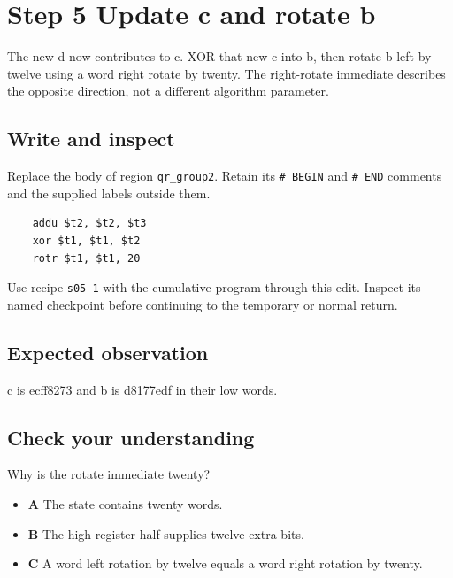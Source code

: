 \section{Step 5 Update c and rotate b}\label{chacha-s05}

The new d now contributes to c. XOR that new c into b, then rotate b left by twelve using a word right rotate by twenty. The right-rotate immediate describes the opposite direction, not a different algorithm parameter.

\subsection{Write and inspect}
Replace the body of region \texttt{qr\_group2}. Retain its \texttt{\# BEGIN} and \texttt{\# END} comments and the supplied labels outside them.

\begin{verbatim}
    addu $t2, $t2, $t3
    xor $t1, $t1, $t2
    rotr $t1, $t1, 20
\end{verbatim}

Use recipe \texttt{s05-1} with the cumulative program through this edit. Inspect its named checkpoint before continuing to the temporary or normal return.

\subsection{Expected observation}
c is ecff8273 and b is d8177edf in their low words.

\subsection{Check your understanding}
Why is the rotate immediate twenty?

\begin{itemize}
  \item \textbf{A} The state contains twenty words.
  \item \textbf{B} The high register half supplies twelve extra bits.
  \item \textbf{C} A word left rotation by twelve equals a word right rotation by twenty.
\end{itemize}
